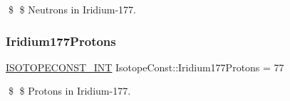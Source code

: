 \$ \$ Neutrons in Iridium-\/177. \mbox{\label{group___isotope_const-_iridium-_ir177_gad3ac75ab6cc05520ec1c900eb7056e68}} 
\subsubsection{\texorpdfstring{Iridium177\+Protons}{Iridium177Protons}}
{\footnotesize\ttfamily \mbox{\hyperlink{group___isotope_const-_macros_ga5f18360b3e99483a35c32d789e62621c}{I\+S\+O\+T\+O\+P\+E\+C\+O\+N\+S\+T\+\_\+\+I\+NT}} Isotope\+Const\+::\+Iridium177\+Protons = 77}

\$ \$ Protons in Iridium-\/177. 